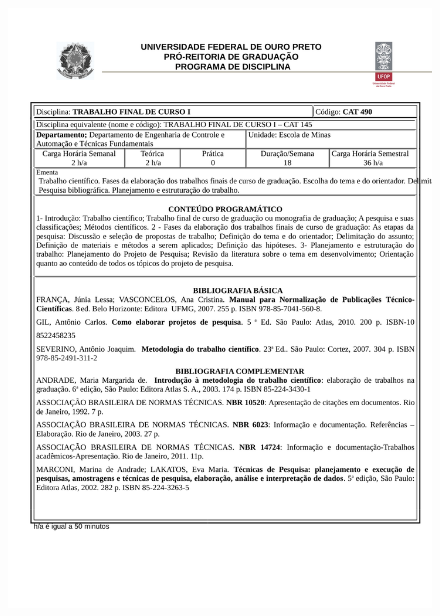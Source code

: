 \begin{figure}[p]
	\centering 
	\includegraphics[scale=0.7]{capitulos/anexo1-programas-disciplina/p93.pdf}
\end{figure}

